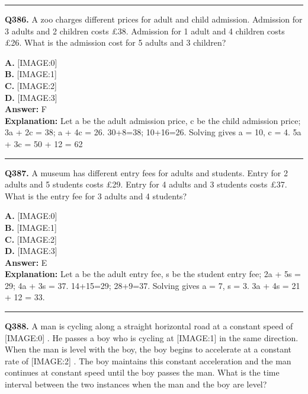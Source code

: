 \documentclass[12pt]{article}
\begin{document}
\hrule
\vspace{1em}


\noindent
\textbf{Q386.} A zoo charges different prices for adult and child admission.
Admission for 3 adults and 2 children costs £38.
Admission for 1 adult and 4 children costs £26.
What is the admission cost for 5 adults and 3 children?



\textbf{A.} [IMAGE:0] \\
\textbf{B.} [IMAGE:1] \\
\textbf{C.} [IMAGE:2] \\
\textbf{D.} [IMAGE:3] \\

\textbf{Answer:} F \\
\textbf{Explanation:} Let a be the adult admission price, c be the child admission price;
3a + 2c = 38; a + 4c = 26.
30+8=38; 10+16=26.
Solving gives a = 10, c = 4.
5a + 3c = 50 + 12 = 62

\hrule
\vspace{1em}


\noindent
\textbf{Q387.} A museum has different entry fees for adults and students.
Entry for 2 adults and 5 students costs £29.
Entry for 4 adults and 3 students costs £37.
What is the entry fee for 3 adults and 4 students?



\textbf{A.} [IMAGE:0] \\
\textbf{B.} [IMAGE:1] \\
\textbf{C.} [IMAGE:2] \\
\textbf{D.} [IMAGE:3] \\

\textbf{Answer:} E \\
\textbf{Explanation:} Let a be the adult entry fee, s be the student entry fee;
2a + 5s = 29; 4a + 3s = 37.
14+15=29; 28+9=37.
Solving gives a = 7, s = 3.
3a + 4s = 21 + 12 = 33.

\hrule
\vspace{1em}


\noindent
\textbf{Q388.} A man is cycling along a straight horizontal road at a constant speed of
[IMAGE:0]
. He passes a boy who is cycling at
[IMAGE:1]
in the same direction. When the man is level with the boy, the boy begins to accelerate at a constant rate of
[IMAGE:2]
. The boy maintains this constant acceleration and the man continues at constant speed until the boy passes the man. What is the time interval between the two instances when the man and the boy are level?
\end{document}
